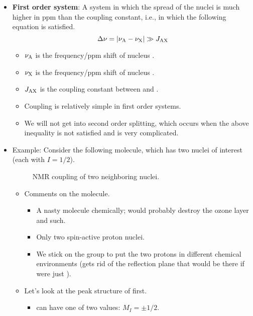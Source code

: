 \documentclass[../notes.tex]{subfiles}
\begin{document}
\begin{itemize}
    \item \textbf{First order system}: A system in which the spread of the nuclei is much higher in ppm than the coupling constant, i.e., in which the following equation is satisfied.
    \begin{equation*}
        \Delta\nu = |\nu_{\ce{A}}-\nu_{\ce{X}}| \gg J_{\ce{AX}}
    \end{equation*}
    \begin{itemize}
        \item $\nu_{\ce{A}}$ is the frequency/ppm shift of nucleus .
        \item $\nu_{\ce{X}}$ is the frequency/ppm shift of nucleus .
        \item $J_{\ce{AX}}$ is the coupling constant between  and .
        \item Coupling is relatively simple in first order systems.
        \item We will not get into second order splitting, which occurs when the above inequality is not satisfied and is very complicated.
    \end{itemize}
    \item Example: Consider the following molecule, which has two nuclei of interest (each with $I=1/2$).
    \begin{figure}[H]
        \centering
        \footnotesize
        \caption{NMR coupling of two neighboring nuclei.}
        \label{fig:couplingTwo}
    \end{figure}
    \begin{itemize}
        \item Comments on the molecule.
        \begin{itemize}
            \item A nasty molecule chemically; would probably destroy the ozone layer and such.
            \item Only two spin-active proton nuclei.
            \item We stick on the  group to put the two protons in different chemical environments (gets rid of the reflection plane that would be there if  were just ).
        \end{itemize}
        \item Let's look at the peak structure of  first.
        \begin{itemize}
            \item {} can have one of two values: $M_I=\pm 1/2$.

\end{itemize}
\end{itemize}
\end{itemize}
\end{document}
